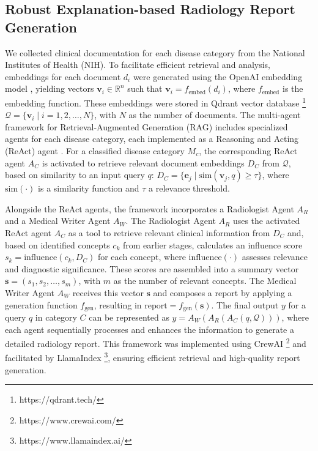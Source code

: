 \documentclass[runningheads]{llncs}
\begin{document}
\subsection{Robust Explanation-based Radiology Report Generation}
\label{subsec:rg}

We collected clinical documentation for each disease category from the National Institutes of Health (NIH). To facilitate efficient retrieval and analysis, embeddings for each document \( d_i \) were generated using the OpenAI embedding model \cite{brown2020language}, yielding vectors \( \mathbf{v}_i \in \mathbb{R}^n \) such that \( \mathbf{v}_i = f_{\text{embed}}(d_i) \), where \( f_{\text{embed}} \) is the embedding function. These embeddings were stored in Qdrant vector database \footnote{https://qdrant.tech/} \( \mathcal{Q} = \{ \mathbf{v}_i \mid i = 1, 2, \ldots, N \} \), with \( N \) as the number of documents. The multi-agent framework for Retrieval-Augmented Generation (RAG) includes specialized agents for each disease category, each implemented as a Reasoning and Acting (ReAct) agent \cite{yao2022react}.  For a classified disease category \( M_c \), the corresponding ReAct agent \( A_C \) is activated to retrieve relevant document embeddings \( D_C \) from \( \mathcal{Q} \), based on similarity to an input query \( q \): \( D_C = \{ \mathbf{e}_j \mid \text{sim}(\mathbf{v}_j, q) \geq \tau \} \), where \( \text{sim}(\cdot) \) is a similarity function and \( \tau \) a relevance threshold.

Alongside the ReAct agents, the framework incorporates a Radiologist Agent \( A_R \) and a Medical Writer Agent \( A_W \). The Radiologist Agent \( A_R \) uses the activated ReAct agent \( A_C \) as a tool to retrieve relevant clinical information from \( D_C \) and, based on identified concepts \( c_k \) from earlier stages, calculates an influence score \( s_k = \text{influence}(c_k, D_C) \) for each concept, where \( \text{influence}(\cdot) \) assesses relevance and diagnostic significance. These scores are assembled into a summary vector \( \mathbf{s} = (s_1, s_2, \ldots, s_m) \), with \( m \) as the number of relevant concepts. The Medical Writer Agent \( A_W \) receives this vector \( \mathbf{s} \) and composes a report by applying a generation function \( f_{\text{gen}} \), resulting in \( \text{report} = f_{\text{gen}}(\mathbf{s}) \). The final output \( y \) for a query \( q \) in category \( C \) can be represented as \( y = A_W(A_R(A_C(q, \mathcal{Q}))) \), where each agent sequentially processes and enhances the information to generate a detailed radiology report. This framework was implemented using CrewAI \footnote{https://www.crewai.com/} and facilitated by LlamaIndex \footnote{https://www.llamaindex.ai/}, ensuring efficient retrieval and high-quality report generation.
\end{document}
